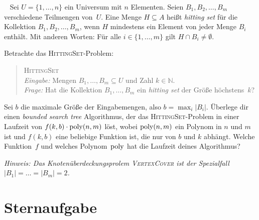 \documentclass{uebung_cs}
\begin{document}
\begin{exercise}\
	Sei $U = \{1,\dots,n\}$ ein Universum mit $n$ Elementen.
	Seien $B_1,B_2,\dots,B_m$ verschiedene Teilmengen von~$U$.
	Eine Menge $H \subseteq A$ heißt \emph{hitting set} für die Kollektion $B_1,B_2,\dots,B_m$, wenn $H$ mindestens ein Element von jeder Menge $B_i$ enthält. Mit anderen Worten: Für alle $i \in \{1,\dots,m\}$ gilt $H \cap B_i \neq \emptyset$.

	Betrachte das \textsc{HittingSet}-Problem:
	\begin{quote}
		\textsc{HittingSet}\\
		\emph{Eingabe:} Mengen $B_1,\dots,B_m\subseteq U$ und Zahl $k\in \mathbb N$.\\
		\emph{Frage:} Hat die Kollektion $B_1,\dots,B_m$ ein \textit{hitting set} der Größe höchstens~$k$?
	\end{quote}

	Sei $b$ die maximale Größe der Eingabemengen, also $b=\max_i|B_i|$.
	Überlege dir einen \textit{bounded search tree} Algorithmus, der das \textsc{HittingSet}-Problem in einer Laufzeit von $f(k,b) \cdot \operatorname{poly}(n,m)$ löst, wobei $\operatorname{poly}(n,m)$ ein Polynom in $n$ und $m$ ist und $f(k,b)$ eine beliebige Funktion ist, die nur von $b$ und $k$ abhängt.
	Welche Funktion~$f$ und welches Polynom~$\operatorname{poly}$ hat die Laufzeit deines Algorithmus?

	\textit{Hinweis: Das Knotenüberdeckungsprolem \textsc{\upshape VertexCover} ist der Spezialfall $|B_1|=\dots=|B_m|=2$.}
\end{exercise}

\section*{Sternaufgabe}
\end{document}
